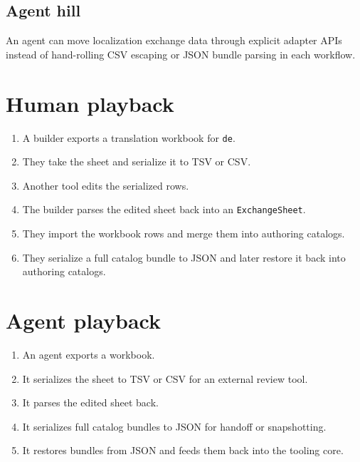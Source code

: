 \subsection{Agent hill}\label{record-191-agent-hill}

An agent can move localization exchange data through explicit adapter APIs instead of hand-rolling CSV escaping or JSON bundle parsing in each workflow.

\section{Human playback}\label{record-191-human-playback}

\begin{enumerate}
\def\labelenumi{\arabic{enumi}.}
\tightlist
\item
  A builder exports a translation workbook for \texttt{d\allowbreak{}e}.
\item
  They take the sheet and serialize it to TSV or CSV.
\item
  Another tool edits the serialized rows.
\item
  The builder parses the edited sheet back into an \texttt{E\allowbreak{}x\allowbreak{}c\allowbreak{}h\allowbreak{}a\allowbreak{}n\allowbreak{}g\allowbreak{}e\allowbreak{}S\allowbreak{}h\allowbreak{}e\allowbreak{}e\allowbreak{}t}.
\item
  They import the workbook rows and merge them into authoring catalogs.
\item
  They serialize a full catalog bundle to JSON and later restore it back into authoring catalogs.
\end{enumerate}

\section{Agent playback}\label{record-191-agent-playback}

\begin{enumerate}
\def\labelenumi{\arabic{enumi}.}
\tightlist
\item
  An agent exports a workbook.
\item
  It serializes the sheet to TSV or CSV for an external review tool.
\item
  It parses the edited sheet back.
\item
  It serializes full catalog bundles to JSON for handoff or snapshotting.
\item
  It restores bundles from JSON and feeds them back into the tooling core.
\end{enumerate}

